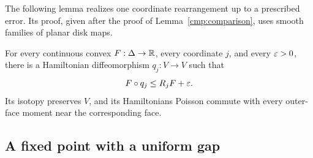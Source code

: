 The following lemma realizes one coordinate rearrangement up to a prescribed
error.  Its proof, given after the proof of Lemma~\ref{cmp:comparison},
uses smooth families of planar disk maps.

\begin{lemma}\label{cmp:lifted}
For every continuous convex \(F:\Delta\to\mathbb R\), every coordinate \(j\),
and every \(\varepsilon>0\), there is a Hamiltonian diffeomorphism
\(q_j:V\to V\) such that
\[
 F\circ q_j\le R_jF+\varepsilon.
\]
Its isotopy preserves \(V\), and its Hamiltonians Poisson commute
with every outer-face moment near the corresponding face.
\end{lemma}

\subsection{A fixed point with a uniform gap}

